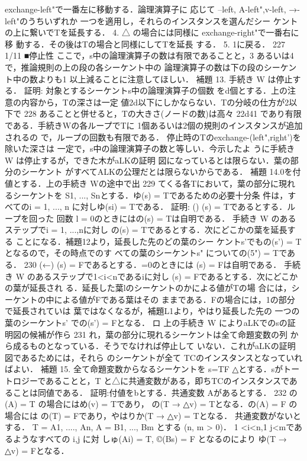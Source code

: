 \documentclass{ltjsarticle}
\theoremstyle{mystyle1}
\theoremstyle{mystyle2}
\begin{document}
exchange-left"で一番左に移動する．論理演算子に 応じて --left, A-left",v-left, →-left"のうちいずれか 一つを適用し，それらのインスタンスを選んだシー
ケントの上に繋いでTを延長する． 4. △ の場合には同様に exchange-right"で一番右に移
動する．その後はTの場合と同様にしてTを延長
する． 5. 1に戻る．
227
1/11
■停止性
ここで，s中の論理演算子の数は有限であることと，3 あるいは4で，推論規則の上の段の各シーケント中の 論理演算子の数は下の段のシーケント中の数よりも1 以上減ることに注意してほしい．
補題 13. 手続き W は停止する． 証明: 対象とするシーケントs中の論理演算子の個数 をd個とする．上の注意の内容から，Tの深さは一定 値2d以下にしかならない．Tの分岐の仕方が2以下で
228
あることと併せると，Tの大きさ(ノードの数)は高々 22d41 であり有限である．手続きWの各ループでTに 1個あるいは2個の規則のインスタンスが追加されるの
で，ループの回数も有限である．
停止時のTのexchange-(left",right')を除いた深さは 一定で，s中の論理演算子の数と等しい．今示したよ うに手続き W は停止するが，できた木がaLKの証明 図になっているとは限らない．葉の部分のシーケント がすべてALKの公理だとは限らないからである．
補題 14.0を付値とする．上の手続き Wの途中で出
229
てくる各Tにおいて，葉の部分に現れるシーケントを S1, ..., Snとする．ゆ(s) = Tであるための必要十分条 件は，すべてのi = 1, ..., n に対しゆ(si) = Tである．
証明: () (s) = Tであるとする．ループを回った 回数 l = 0のときにはの(s) = Tは自明である． 手続き W のあるステップでi = 1, ...,nに対し の(s) = Tであるとする．次にどこかの葉を延長する ことになる．補題12より，延長した先のどの葉のシー ケントs'でもの(s') = Tとなるので，その時点でのす べての葉のシーケントs" についての(5") = Tである．
230
(←) (s) = Fであるとする．=0のときには
(s) = Fは自明である． 手続き W のあるステップで1<i<nであるiに対し (s) = Fであるとする．次にどこかの葉が延長され る．延長した葉lのシーケントのかによる値がTの場 合には，シーケントの中による値がFである葉はその ままである．Fの場合には，1の部分で延長されていは 葉ではなくなるが，補題L1より，やはり延長した先の 一つの葉のシーケントs' での(s') = Fとなる． ロ
上の手続き W によりaLKでのsの証明図の候補が作ら
231
れ，葉の部分に現れるシーケントは全て命題変数の列 から成るものとなっている．そうでなければ停止して いない．これがaLKの証明図であるためには，それら のシーケントが全て TCのインスタンスとなっていれ ばよい．
補題 15. 全て命題変数からなるシーケントを s=TF △とする．sがトートロジーであることと，T と△に共通変数がある，即ちTCのインスタンスであ ることは同値である．
証明:付値をbとする．共通変数 Aがあるとする．
232
の(A) = T の場合にはめ(v) = Tであり， の(T → △v) = Tとなる．の(A) = F の場合には の(T) = Fであり，やはりか(T → △v) = Tとなる． 共通変数がないとする． T = A1, ...., An, A = B1, ..., Bm とする (n, m > 0)． 1 <i<n,1 j<mであるようなすべての i,j に対 しゅ(Ai) = T, ©(Bs) = F となるのにより ゆ(T → △v) = Fとなる．
\end{document}
